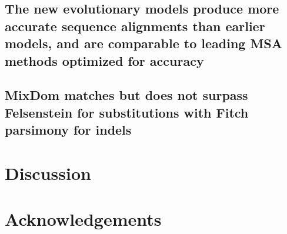 


\subsection{The new evolutionary models produce more accurate sequence alignments than earlier models, and are comparable to leading MSA methods optimized for accuracy}






\subsection{MixDom matches but does not surpass Felsenstein for substitutions with Fitch parsimony for indels}


\section{Discussion}




\section{Acknowledgements}




